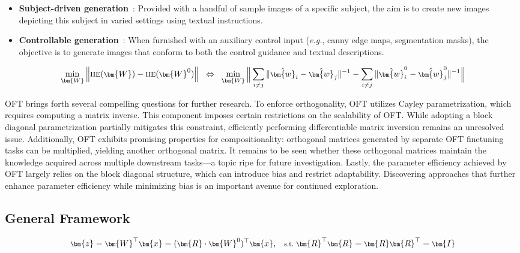 \begin{itemize}[leftmargin=*,nosep]
    \item \textbf{Subject-driven generation}~\cite{ruiz2023dreambooth}: Provided with a handful of sample images of a specific subject, the aim is to create new images depicting this subject in varied settings using textual instructions.
    \item \textbf{Controllable generation}~\cite{zhang2023adding,mou2023t2i}: When furnished with an auxiliary control input (\emph{e.g.}, canny edge maps, segmentation masks), the objective is to generate images that conform to both the control guidance and textual descriptions.
\end{itemize}

\begin{equation}\label{eq:oft_principle}
\footnotesize
\min_{\bm{W}} \left\| \text{HE}(\bm{W})-\text{HE}(\bm{W}^0)\right\|~~\Leftrightarrow~~\min_{\bm{W}} \bigg{\|} \sum_{i\neq j} \|\hat{\bm{w}}_i-\hat{\bm{w}}_j\|^{-1}-\sum_{i\neq j} \|\hat{\bm{w}}^0_i-\hat{\bm{w}}^0_j\|^{-1}\bigg{\|}
\end{equation}

OFT brings forth several compelling questions for further research. To enforce orthogonality, OFT utilizes Cayley parametrization, which requires computing a matrix inverse. This component imposes certain restrictions on the scalability of OFT. While adopting a block diagonal parametrization partially mitigates this constraint, efficiently performing differentiable matrix inversion remains an unresolved issue. Additionally, OFT exhibits promising properties for compositionality: orthogonal matrices generated by separate OFT finetuning tasks can be multiplied, yielding another orthogonal matrix. It remains to be seen whether these orthogonal matrices maintain the knowledge acquired across multiple downstream tasks—a topic ripe for future investigation. Lastly, the parameter efficiency achieved by OFT largely relies on the block diagonal structure, which can introduce bias and restrict adaptability. Discovering approaches that further enhance parameter efficiency while minimizing bias is an important avenue for continued exploration.

\subsection{General Framework}

\begin{equation}\label{eq:oft_general}
    \footnotesize
    \bm{z}=\bm{W}^\top\bm{x}=(\bm{R}\cdot\bm{W}^0)^\top\bm{x},~~~\text{s.t.}~\bm{R}^\top\bm{R}=\bm{R}\bm{R}^\top=\bm{I}
\end{equation}

